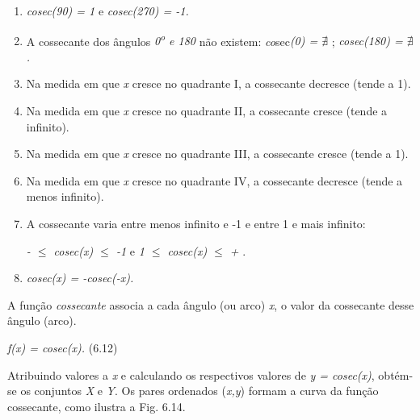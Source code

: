 \begin{caixa}
\begin{enumerate}
    \item \textit{cosec(90\degree) = 1}   e  \textit{cosec(270\degree) = -1.}

    \item A cossecante dos ângulos \textit{0\textsuperscript{o} e 180\degree} não existem: \textit{co}sec\textit{(0\degree) =  \(  \nexists  \) };  \textit{cosec(180\degree) =  \(  \nexists  \) .}

    \item Na medida em que \textit{x} cresce no quadrante I, a cossecante decresce (tende a 1).

    \item Na medida em que \textit{x} cresce no quadrante II, a cossecante cresce (tende a infinito).

    \item Na medida em que \textit{x} cresce no quadrante III, a cossecante cresce (tende a 1).

    \item Na medida em que \textit{x} cresce no quadrante IV, a cossecante decresce (tende a menos infinito).

    \item A cossecante varia entre menos infinito e -1 e entre 1 e mais infinito: 

 \textit{-  $ \leq $  cosec(x) $ \leq $  -1  }e\textit{   1 $ \leq $  cosec(x) $ \leq $  +   }.

    \item \textit{ cosec(x) = -cosec(-x).}
\end{enumerate}
\end{caixa}

\begin{caixa}
A função \textit{cossecante} associa a cada ângulo (ou arco) \textit{x}, o valor da cossecante desse ângulo (arco).

\textit{f(x) = cosec(x).} \tab (6.12)
\end{caixa}

Atribuindo valores a \textit{x} e calculando os respectivos valores de \textit{y = cosec(x)}, obtém-se os conjuntos \textit{X }e\textit{ Y}. Os pares ordenados (\textit{x,y}) formam a curva da função cossecante, como ilustra a Fig. 6.14.

